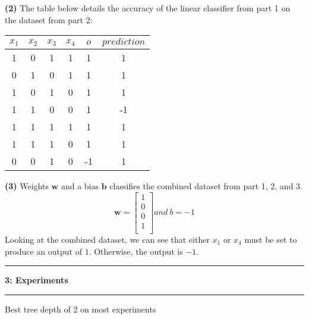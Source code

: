 \documentclass[11pt]{article}
\newcommand\question[2]{\vspace{.25in}\hrule\textbf{#1: #2}\vspace{.5em}\hrule\vspace{.10in}}
\renewcommand\part[1]{\vspace{.10in}\textbf{(#1)}}
\begin{document}
\part{2} The table below details the accuracy of the linear classifier from part 1 on the dataset from part 2:
 \begin{center}
    \begin{tabular}{cccc|c|c}
      $x_1$ & $x_2$ & $x_3$ & $x_4$ & $o$ & $prediction$\\ \hline
      1 & 0 & 1 & 1 & 1 & 1\\
      0 & 1 & 0 & 1 & 1 & 1\\
      1 & 0 & 1 & 0 & 1 & 1\\
      1 & 1 & 0 & 0 & 1 & -1\\
      1 & 1 & 1 & 1 & 1 & 1\\
      1 & 1 & 1 & 0 & 1 & 1\\
      0 & 0 & 1 & 0 & -1 & 1\\
    \end{tabular}
  \end{center}

\part{3} Weights $\mathbf{w}$ and a bias $\mathbf{b}$ classifies the combined dataset from part 1, 2, and 3.
$$
\mathbf{w} = \begin{bmatrix}
1 \\
0 \\
0 \\
1 \\ 	
\end{bmatrix}
 and \ b = -1
$$
Looking at the combined dataset, we can see that either $x_1$ or $x_4$ must be set to produce an output of $1$. Otherwise, the output is $-1$.

\question{3}{Experiments}
Best tree depth of 2 on most experiments
\end{document}

